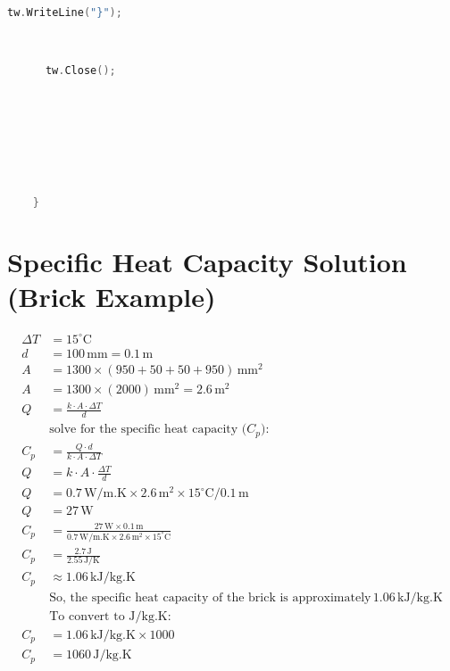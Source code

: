\begin{theappendices}
\begin{lstlisting}[language=c++, caption= Code in GH to write OF text file in 0/Brick/T]
      tw.WriteLine("}");



      tw.Close();








    }

\end{lstlisting}








\singlespacing
\chapter{Specific Heat Capacity Solution (Brick Example)}
\begin{equation}
\begin{aligned}
\Delta T &= 15^\circ \text{C} \\
d &= 100 \, \text{mm} = 0.1 \, \text{m} \\
A &= 1300 \times (950 + 50 + 50 + 950) \, \text{mm}^2 \\
A &= 1300 \times (2000) \, \text{mm}^2 = 2.6 \, \text{m}^2 \\
Q &= \frac{k \cdot A \cdot \Delta T}{d} \\
&\text{solve for the specific heat capacity ($C_p$):} \\
C_p &= \frac{Q \cdot d}{k \cdot A \cdot \Delta T} \\
Q &= k \cdot A \cdot \frac{\Delta T}{d} \\
Q &= 0.7 \, \text{W/m.K} \times 2.6 \, \text{m}^2 \times 15^\circ \text{C} / 0.1 \, \text{m} \\
Q &= 27 \, \text{W} \\
C_p &= \frac{27 \, \text{W} \times 0.1 \, \text{m}}{0.7 \, \text{W/m.K} \times 2.6 \, \text{m}^2 \times 15^\circ \text{C}} \\
C_p &= \frac{2.7 \, \text{J}}{2.55 \, \text{J/K}} \\
C_p &\approx 1.06 \, \text{kJ/kg.K} \\
&\text{So, the specific heat capacity of the brick is approximately} \, 1.06 \, \text{kJ/kg.K} \\
&\text{To convert to J/kg.K:} \\
C_p &= 1.06 \, \text{kJ/kg.K} \times 1000 \\
C_p &= 1060 \, \text{J/kg.K}
\end{aligned}
\label{appendcp}
\end{equation}

\end{theappendices}
